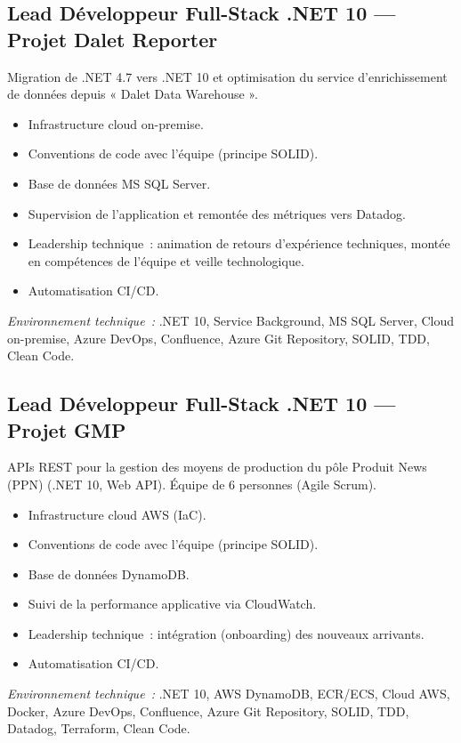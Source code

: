 \documentclass[10pt,a4paper]{article}
\begin{document}
\subsection*{Lead Développeur Full-Stack .NET 10 --- Projet Dalet Reporter}
\color{darkgray}
Migration de .NET 4.7 vers .NET 10 et optimisation du service d'enrichissement de données depuis « Dalet Data Warehouse ».
\begin{itemize}
  \item Infrastructure cloud on-premise.
  \item Conventions de code avec l'équipe (principe SOLID).
  \item Base de données MS SQL Server.
  \item Supervision de l'application et remontée des métriques vers Datadog.
  \item Leadership technique~: animation de retours d'expérience techniques, montée en compétences de l'équipe et veille technologique.
  \item Automatisation CI/CD.
\end{itemize}
\textit{Environnement technique~:} .NET 10, Service Background, MS SQL Server, Cloud on-premise, Azure DevOps, Confluence, Azure Git Repository, SOLID, TDD, Clean Code.

\vspace{6pt}

\subsection*{Lead Développeur Full-Stack .NET 10 --- Projet GMP}
\color{darkgray}
APIs REST pour la gestion des moyens de production du pôle Produit News (PPN) (.NET 10, Web API). Équipe de 6 personnes (Agile Scrum).
\begin{itemize}
  \item Infrastructure cloud AWS (IaC).
  \item Conventions de code avec l'équipe (principe SOLID).
  \item Base de données DynamoDB.
  \item Suivi de la performance applicative via CloudWatch.
  \item Leadership technique~: intégration (onboarding) des nouveaux arrivants.
  \item Automatisation CI/CD.
\end{itemize}
\textit{Environnement technique~:} .NET 10, AWS DynamoDB, ECR/ECS, Cloud AWS, Docker, Azure DevOps, Confluence, Azure Git Repository, SOLID, TDD, Datadog, Terraform, Clean Code.
\end{document}

